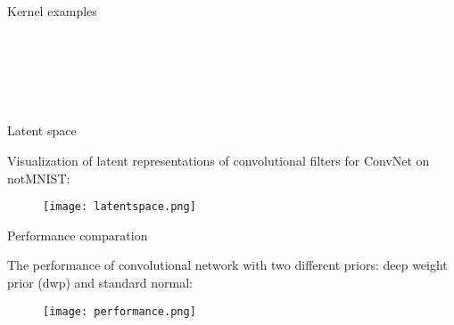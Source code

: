 \documentclass[19pt]{beamer}
\begin{document}
\begin{frame}{Kernel examples}
\begin{figure}
    \centering
    \begin{subfigure}%
        \texttt{[image: vaekernel1.png]}
    \end{subfigure}
    ~ %
    \begin{subfigure}%
        \texttt{[image: vaekernel2.png]}
        \label{fig:tiger}
    \end{subfigure}
    ~ %
    \begin{subfigure}%
        \texttt{[image: vaekernel3.png]}
        \label{fig:mouse}
    \end{subfigure}
     ~ %
    \begin{subfigure}%
        \texttt{[image: vaekernel4.png]}
        \label{fig:mouse}
    \end{subfigure}
    \label{fig:animals}
\end{figure}

\end{frame}

\begin{frame}{Latent space}

Visualization of latent representations of convolutional filters
for ConvNet on notMNIST:\\

\begin{figure}
    \centering
    \texttt{[image: latentspace.png]}
    \label{fig:my_label}
\end{figure}

\end{frame}

\begin{frame}{Performance comparation}

The performance of convolutional network with two different priors: deep weight prior (dwp) and standard normal:\\

\begin{figure}
    \centering
    \texttt{[image: performance.png]}
    \label{fig:my_label}
\end{figure}

\end{frame}
\end{document}
